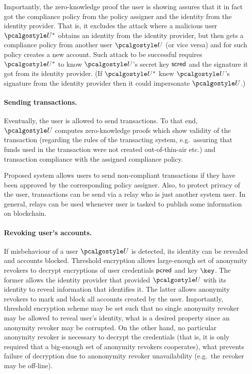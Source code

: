 \documentclass[runningheads,10pt]{llncs}
\numberwithin{equation}{section}
\begin{document}
Importantly, the zero-knowledge proof the user is showing assures that it in fact got
the compliance policy from the policy assigner and the identity from the identity
provider. That is, it excludes the attack where a malicious user $\user^*$ obtains an
identity from the identity provider, but then gets a compliance policy from another
user $\user$ (or vice versa) and for such policy creates a new account. Such attack
to be successful requires $\user^*$ to know $\user$'s secret key $\mathsf{scred}$ and the
signature it got from its identity provider. (If $\user^*$ knew $\user$'s signature
from the identity provider then it could impersonate $\user$.)


\paragraph{Sending transactions.} Eventually, the user is allowed to send
transactions. To that end, $\user$ computes zero-knowledge proofs which show validity
of the transaction (regarding the rules of the transacting system, e.g.~assuring that
funds used in the transaction were not created out-of-thin-air etc.) and transaction
compliance with the assigned compliance policy.

Proposed system allows users to send non-compliant transactions if they have been
approved by the corresponding policy assigner. Also, to protect privacy of the user,
transactions can be send via a {\pistis{}} relay who is just another system user. In
general, relays can be used whenever user is tasked to publish some information on
blockchain.

\paragraph{Revoking user's accounts.} If misbehaviour of a user $\user$ is detected, its
identity can be revealed and accounts blocked.  Threshold encryption allows
large-enough set of anonymity revokers to decrypt encryptions of user credentials
$\mathsf{pcred}$ and key $\key$. The former allows the identity provider that provided
$\user$ with its identity to reveal information that identifies it. The latter allows
anonymity revokers to mark and block all accounts created by the user. Importantly,
threshold encryption scheme may be set such that no single anonymity revoker may be
allowed to reveal user's identity, what is a desired property since an anonymity
revoker may be corrupted. On the other hand, no particular anonymity revoker is
necessary to decrypt the credentials (that is, it is only required that a big-enough
set of anonymity revokers cooperates), what prevents failure of decryption due to
anononymity revoker unavailability (e.g.~the revoker may be off-line).
\end{document}
